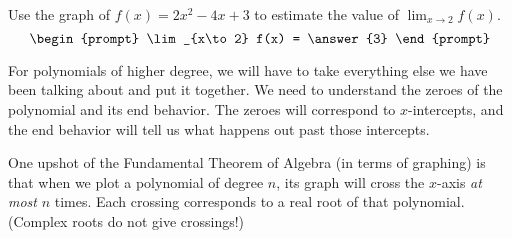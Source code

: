 \documentclass{ximera}
\begin{document}
\begin{problem}
	Use the graph of $f(x) = 2x^2 - 4x + 3$ to estimate the value of $\lim_{x\to 2} f(x)$.
	\[ \begin{prompt} 
		\lim_{x\to 2} f(x) = \answer{3} 
	\end{prompt}\]
\end{problem} 

For polynomials of higher degree, we will have to take everything else we have been talking about and put it together.  
We need to understand the zeroes of the polynomial and its end behavior.  The zeroes will correspond to $x$-intercepts, and the
end behavior will tell us what happens out past those intercepts.

One upshot of the Fundamental Theorem of Algebra (in terms of graphing) is that when we plot a
polynomial of degree $n$, its graph will cross the $x$-axis \emph{at most}
$n$ times.  Each crossing corresponds to a real root of that polynomial.  (Complex roots do not give crossings!)
\end{document}
